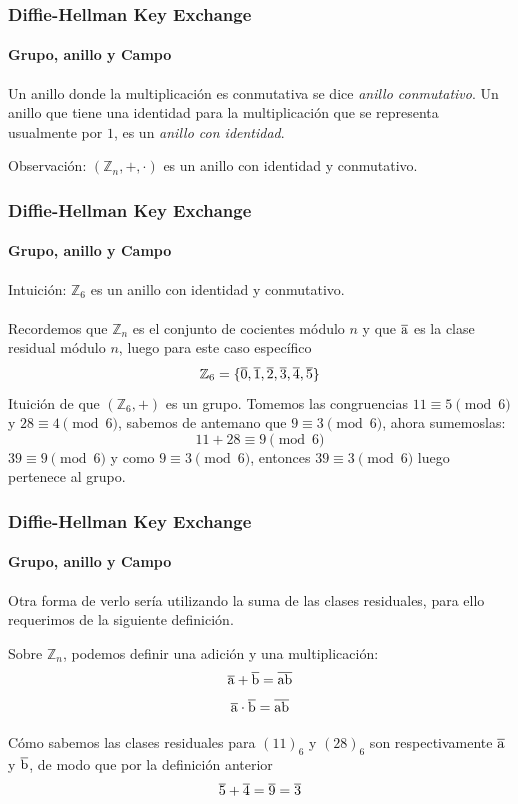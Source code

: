 \documentclass[spanish, mexico]{beamer}
\begin{document}
	\begin{frame}
	    \frametitle{Diffie-Hellman Key Exchange}
		\framesubtitle{Grupo, anillo y Campo}
	    \begin{definition} 
		    Un anillo donde la multiplicación es conmutativa se dice \textit{anillo conmutativo}. Un anillo que tiene una identidad para la multiplicación que se representa usualmente por $1$, es un \textit{anillo con identidad}.
		\end{definition}
		Observación: $(\mathbb{Z}_n, +, \cdot)$ es un anillo con identidad y conmutativo.
	\end{frame}
	
	\begin{frame}
	    \frametitle{Diffie-Hellman Key Exchange}
		\framesubtitle{Grupo, anillo y Campo}
            Intuición: $\mathbb{Z}_6$ es un anillo con identidad y conmutativo.\\~\\
            Recordemos que $\mathbb{Z}_n$ es el conjunto de cocientes módulo $n$ y que $\overline{\rm a}$ es la clase residual módulo $n$, luego para este caso específico
            $$\mathbb{Z}_6 = \{ \overline{\rm 0}, \overline{\rm 1}, \overline{\rm 2}, \overline{\rm 3}, \overline{\rm 4}, \overline{\rm 5} \}$$
        	Ituición de que $(\mathbb{Z}_6, +)$ es un grupo. Tomemos las congruencias $11 \equiv 5 \pmod{6}$ y $28 \equiv 4 \pmod{6}$, sabemos de antemano que $9 \equiv 3 \pmod{6}$, ahora sumemoslas:
        	$$11 + 28 \equiv 9 \pmod{6}$$
        	$39 \equiv 9 \pmod{6}$ y como $9 \equiv 3 \pmod{6}$, entonces $39 \equiv 3 \pmod{6}$ luego pertenece al grupo.
	\end{frame}
	
	\begin{frame}
	    \frametitle{Diffie-Hellman Key Exchange}
		\framesubtitle{Grupo, anillo y Campo}
        Otra forma de verlo sería utilizando la suma de las clases residuales, para ello requerimos de la siguiente definición.
        \begin{definition}
            Sobre $\mathbb{Z}_n$, podemos definir una adición y una multiplicación:
            $$\overline{\rm a} + \overline{\rm b} = \overline{\rm ab}$$
            $$\overline{\rm a}\cdot \overline{\rm b} = \overline{\rm ab}$$
        \end{definition}
        Cómo sabemos las clases residuales para $(11)_6$ y $(28)_6$ son respectivamente $\overline{\rm a}$ y $\overline{\rm b}$, de modo que por la definición anterior
        $$\overline{\rm 5} + \overline{\rm 4} = \overline{\rm 9} = \overline{\rm 3}$$
	\end{frame}
	
\end{document}
